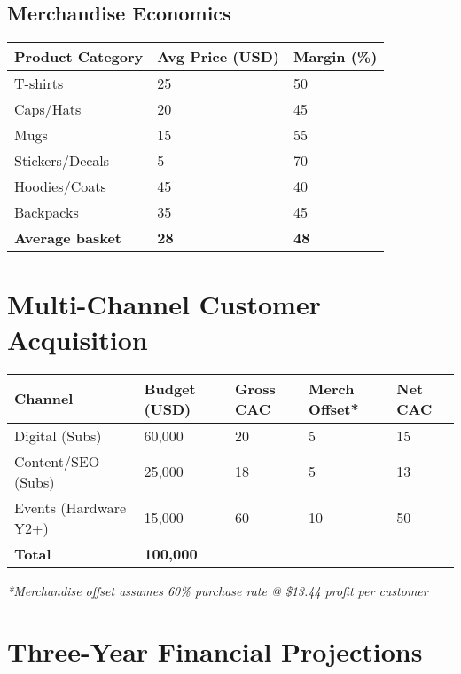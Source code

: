 \documentclass[11pt]{article}
\begin{document}
\subsection{Merchandise Economics}
\begin{table}[H]
\centering
\begin{tabularx}{\linewidth}{l Y Y}
\toprule
Product Category & Avg Price (USD) & Margin (\%) \\\midrule
T-shirts & 25 & 50 \\
Caps/Hats & 20 & 45 \\
Mugs & 15 & 55 \\
Stickers/Decals & 5 & 70 \\
Hoodies/Coats & 45 & 40 \\
Backpacks & 35 & 45 \\
\textbf{Average basket} & \textbf{28} & \textbf{48} \\
\bottomrule
\end{tabularx}
\end{table}

\section{Multi-Channel Customer Acquisition}

\begin{table}[H]
\centering
\begin{tabularx}{\linewidth}{l Y Y Y Y}
\toprule
Channel & Budget (USD) & Gross CAC & Merch Offset* & Net CAC \\\midrule
Digital (Subs) & 60,000 & 20 & 5 & 15 \\
Content/SEO (Subs) & 25,000 & 18 & 5 & 13 \\
Events (Hardware Y2+) & 15,000 & 60 & 10 & 50 \\\midrule
\textbf{Total} & \textbf{100,000} &  &  &  \\
\bottomrule
\end{tabularx}
\end{table}
\textit{*Merchandise offset assumes 60\% purchase rate @ \$13.44 profit per customer}

\section{Three-Year Financial Projections}
\end{document}
